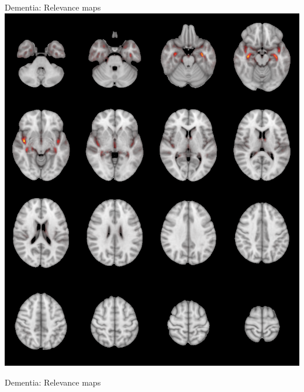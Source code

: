 \documentclass[c]{beamer}
\begin{document}
\begin{frame}{Dementia: Relevance maps}
		\includegraphics[width=\width]{data/94405.png}
		\vfill
	\end{frame}

	\begin{frame}{Dementia: Relevance maps} %
		\centering
	\end{frame}
\end{document}
